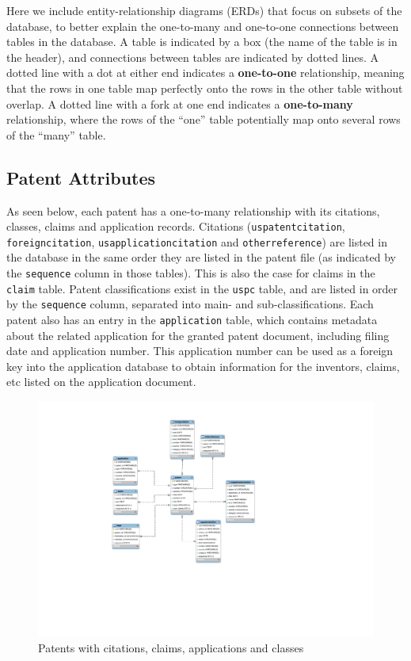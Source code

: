 Here we include entity-relationship diagrams (ERDs) that focus on subsets of the database, to better explain the one-to-many and one-to-one connections between tables in the database. A table is indicated by a box (the name of the table is in the header), and connections between tables are indicated by dotted lines. A dotted line with a dot at either end indicates a \textbf{one-to-one} relationship, meaning that the rows in one table map perfectly onto the rows in the other table without overlap. A dotted line with a fork at one end indicates a \textbf{one-to-many} relationship, where the rows of the ``one'' table potentially map onto several rows of the ``many'' table.

\subsection*{Patent Attributes}

As seen below, each patent has a one-to-many relationship with its citations, classes, claims and application records. Citations (\verb`uspatentcitation`, \verb`foreigncitation`, \verb`usapplicationcitation` and \verb`otherreference`) are listed in the database in the same order they are listed in the patent file (as indicated by the \verb`sequence` column in those tables). This is also the case for claims in the \verb`claim` table. Patent classifications exist in the \verb`uspc` table, and are listed in order by the \verb`sequence` column, separated into main- and sub-classifications. Each patent also has an entry in the \verb`application` table, which contains metadata about the related application for the granted patent document, including filing date and application number. This application number can be used as a foreign key into the application database to obtain information for the inventors, claims, etc listed on the application document.

\begin{figure}[!htbp]
\includegraphics[width=\linewidth]{figs/Patentattributes}
\caption{Patents with citations, claims, applications and classes}
\end{figure}

